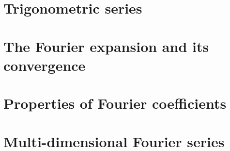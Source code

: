 \section{Trigonometric series}
\section{The Fourier expansion and its convergence}
\section{Properties of Fourier coefficients}
\section{Multi-dimensional Fourier series}